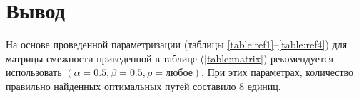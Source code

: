 \section{Вывод}

На основе проведенной параметризации (таблицы \ref{table:ref1}--\ref{table:ref4}) для матрицы смежности
приведенной в таблице (\ref{table:matrix}) рекомендуется использовать
$(\alpha = 0.5, \beta = 0.5, \rho = \text{любое})$.
При этих параметрах, количество правильно найденных оптимальных путей составило 8 единиц.

